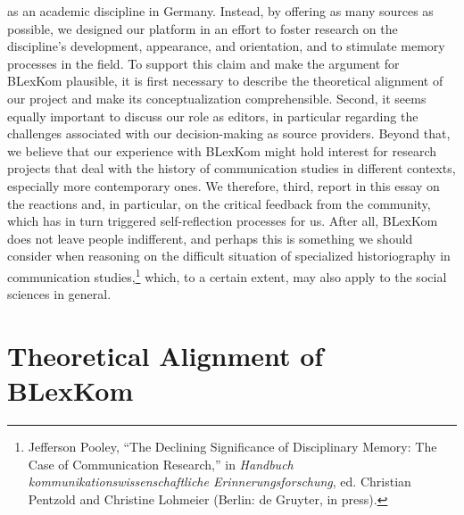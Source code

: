 \documentclass{tufte-handout}
\begin{document}
\noindent as an academic
discipline in Germany. Instead, by offering as many sources as possible,
we designed our platform in an effort to foster research on the
discipline's development, appearance, and orientation, and to stimulate
memory processes in the field. To support this claim and make the
argument for BLexKom plausible, it is first necessary to describe the
theoretical alignment of our project and make its conceptualization
comprehensible. Second, it seems equally important to discuss our role
as editors, in particular regarding the challenges associated with our
decision-making as source providers. Beyond that, we believe that our
experience with BLexKom might hold interest for research projects that
deal with the history of communication studies in different contexts,
especially more contemporary ones. We therefore, third, report in this
essay on the reactions and, in particular, on the critical feedback from
the community, which has in turn triggered self-reflection processes for
us. After all, BLexKom does not leave people indifferent, and perhaps
this is something we should consider when reasoning on the difficult
situation of specialized historiography in communication
studies,\footnote{Jefferson Pooley, ``The Declining Significance of Disciplinary Memory:
  The Case of Communication Research,'' in \emph{Handbuch
  kommunikationswissenschaftliche Erinnerungsforschung}, ed. Christian
  Pentzold and Christine Lohmeier (Berlin: de Gruyter, in press).
} which, to a certain
extent, may also apply to the social sciences in general.

\hypertarget{theoretical-alignment-of-blexkom}{%
\section{Theoretical Alignment of
BLexKom}\label{theoretical-alignment-of-blexkom}}
\end{document}
